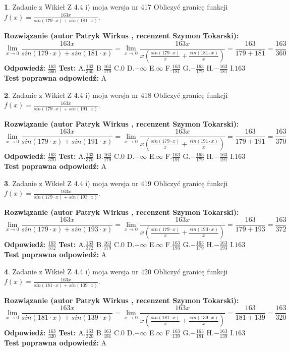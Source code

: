 \documentclass[12pt, a4paper]{article}
\theoremstyle{definition} %
\newtheorem{zad}{}
\newcommand{\zadStart}[1]{\begin{zad}#1\newline}
\newcommand{\zadStop}{\end{zad}}
\newcommand{\rozwStart}[2]{\noindent \textbf{Rozwiązanie (autor #1 , recenzent #2): }\newline}
\newcommand{\rozwStop}{\newline}
\newcommand{\odpStart}{\noindent \textbf{Odpowiedź:}\newline}
\newcommand{\odpStop}{\newline}
\newcommand{\testStart}{\noindent \textbf{Test:}\newline}
\newcommand{\testStop}{\newline}
\newcommand{\kluczStart}{\noindent \textbf{Test poprawna odpowiedź:}\newline}
\newcommand{\kluczStop}{\newline}
\begin{document}
\zadStart{Zadanie z Wikieł Z 4.4 i) moja wersja nr 417}
Obliczyć granicę funkcji $f(x)=\frac{163x}{sin(179\cdot x) +sin(181\cdot x)}$.
\zadStop
\rozwStart{Patryk Wirkus}{Szymon Tokarski}
$$\lim\limits_{x\to 0}\frac{163x}{sin(179\cdot x) +sin(181\cdot x)}=\lim\limits_{x\to 0}\frac{163x}{x(\frac{sin(179\cdot x)}{x}+\frac{sin(181\cdot x)}{x})}=\frac{163}{179+181} = \frac{163}{360}$$
\rozwStop
\odpStart
$\frac{163}{360}$
\odpStop
\testStart
A.$\frac{163}{360}$
B.$\frac{163}{179}$
C.$0$
D.$-\infty$
E.$\infty$
F.$\frac{163}{181}$
G.$-\frac{163}{179}$
H.$-\frac{163}{181}$
I.$163$
\testStop
\kluczStart
A
\kluczStop



\zadStart{Zadanie z Wikieł Z 4.4 i) moja wersja nr 418}
Obliczyć granicę funkcji $f(x)=\frac{163x}{sin(179\cdot x) +sin(191\cdot x)}$.
\zadStop
\rozwStart{Patryk Wirkus}{Szymon Tokarski}
$$\lim\limits_{x\to 0}\frac{163x}{sin(179\cdot x) +sin(191\cdot x)}=\lim\limits_{x\to 0}\frac{163x}{x(\frac{sin(179\cdot x)}{x}+\frac{sin(191\cdot x)}{x})}=\frac{163}{179+191} = \frac{163}{370}$$
\rozwStop
\odpStart
$\frac{163}{370}$
\odpStop
\testStart
A.$\frac{163}{370}$
B.$\frac{163}{179}$
C.$0$
D.$-\infty$
E.$\infty$
F.$\frac{163}{191}$
G.$-\frac{163}{179}$
H.$-\frac{163}{191}$
I.$163$
\testStop
\kluczStart
A
\kluczStop



\zadStart{Zadanie z Wikieł Z 4.4 i) moja wersja nr 419}
Obliczyć granicę funkcji $f(x)=\frac{163x}{sin(179\cdot x) +sin(193\cdot x)}$.
\zadStop
\rozwStart{Patryk Wirkus}{Szymon Tokarski}
$$\lim\limits_{x\to 0}\frac{163x}{sin(179\cdot x) +sin(193\cdot x)}=\lim\limits_{x\to 0}\frac{163x}{x(\frac{sin(179\cdot x)}{x}+\frac{sin(193\cdot x)}{x})}=\frac{163}{179+193} = \frac{163}{372}$$
\rozwStop
\odpStart
$\frac{163}{372}$
\odpStop
\testStart
A.$\frac{163}{372}$
B.$\frac{163}{179}$
C.$0$
D.$-\infty$
E.$\infty$
F.$\frac{163}{193}$
G.$-\frac{163}{179}$
H.$-\frac{163}{193}$
I.$163$
\testStop
\kluczStart
A
\kluczStop



\zadStart{Zadanie z Wikieł Z 4.4 i) moja wersja nr 420}
Obliczyć granicę funkcji $f(x)=\frac{163x}{sin(181\cdot x) +sin(139\cdot x)}$.
\zadStop
\rozwStart{Patryk Wirkus}{Szymon Tokarski}
$$\lim\limits_{x\to 0}\frac{163x}{sin(181\cdot x) +sin(139\cdot x)}=\lim\limits_{x\to 0}\frac{163x}{x(\frac{sin(181\cdot x)}{x}+\frac{sin(139\cdot x)}{x})}=\frac{163}{181+139} = \frac{163}{320}$$
\rozwStop
\odpStart
$\frac{163}{320}$
\odpStop
\testStart
A.$\frac{163}{320}$
B.$\frac{163}{181}$
C.$0$
D.$-\infty$
E.$\infty$
F.$\frac{163}{139}$
G.$-\frac{163}{181}$
H.$-\frac{163}{139}$
I.$163$
\testStop
\kluczStart
A
\kluczStop
\end{document}
